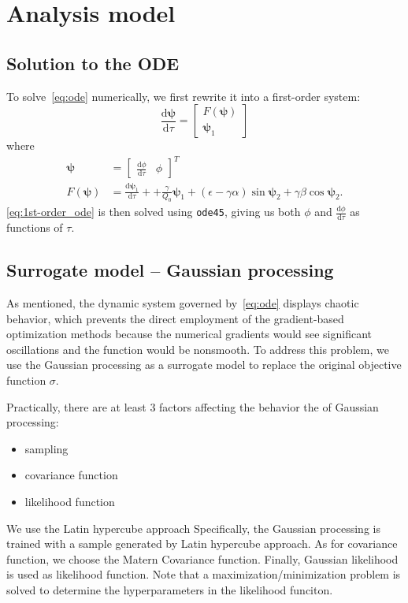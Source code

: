 \documentclass[a4paper]{article}
\newcommand{\diff}[0]{\mathrm{d}}
\begin{document}
\section{Analysis model} \label{sec:analysis_tool}
\subsection{Solution to the ODE}
To solve~\eqref{eq:ode} numerically, we first rewrite it into a first-order system:
\begin{equation}\label{eq:1st-order_ode}
\frac{\diff \bm{\psi}}{\diff\tau} = \begin{bmatrix}
F(\bm{\psi}) \\ \bm{\psi}_1
\end{bmatrix}
\end{equation}
where
\begin{equation}
\begin{aligned}
\bm{\psi} &= \begin{bmatrix} \frac{\diff\phi}{\diff\tau} & \phi \end{bmatrix}^T \\
F(\bm{\psi}) &= \frac{\diff\bm{\psi}_1}{\diff\tau} + + \frac{\gamma}{Q_0}\bm{\psi}_1 + (\epsilon - \gamma\alpha)\sin{\bm{\psi}_2} + \gamma\beta\cos{\bm{\psi}_2}.
\end{aligned}
\end{equation}
\eqref{eq:1st-order_ode} is then solved using \texttt{ode45}, giving us both $\phi$ and $\frac{\diff\phi}{\diff\tau}$ as functions of $\tau$.
\subsection{Surrogate model -- Gaussian processing}\label{surrogate}
As mentioned, the dynamic system governed by~\eqref{eq:ode} displays chaotic behavior, which prevents the direct employment of the gradient-based optimization methods because the numerical gradients would see significant oscillations and the function would be nonsmooth. To address this problem, we use the Gaussian processing as a surrogate model to replace the original objective function $\sigma$. 

Practically, there are at least 3 factors affecting the behavior the of Gaussian processing:
\begin{itemize}
  \item sampling
  \item covariance function
  \item likelihood function
  \
\end{itemize}
We use the Latin hypercube approach
Specifically, the Gaussian processing is trained with a sample generated by Latin hypercube approach. As for covariance function, we choose the Matern Covariance function. Finally, Gaussian likelihood is used as likelihood function. Note that a maximization/minimization problem is solved to determine the hyperparameters in the likelihood funciton.
\end{document}
